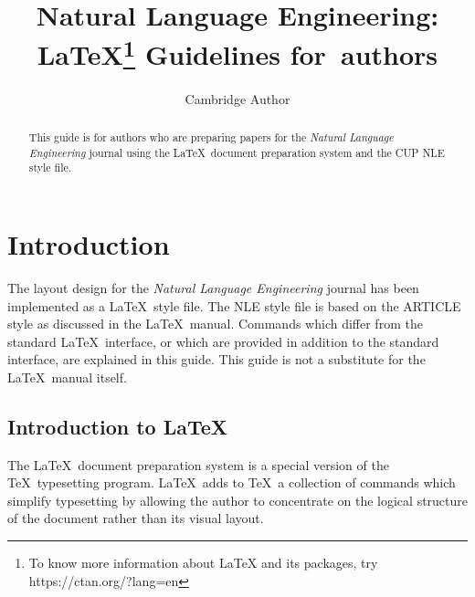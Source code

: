 \documentclass{nle}
\begin{document}
\label{firstpage}




\title{Natural Language Engineering: \LaTeX\footnote{To know more information about LaTeX and its packages, try https://ctan.org/?lang=en} Guidelines for~authors}

\begin{authgrp}
\author{Cambridge Author}
\end{authgrp}


\begin{abstract}
This guide is for authors who are preparing papers for the {\em Natural Language Engineering} journal using the \LaTeX\ document preparation
system and the CUP NLE style file.
\end{abstract}

\maketitle

\section{Introduction}

The layout design for the {\em Natural Language Engineering} journal
has been implemented as a \LaTeX\ style file. The NLE style file is based
on the ARTICLE style as discussed in the \LaTeX\ manual. Commands which
differ from the standard \LaTeX\ interface, or which are provided in addition
to the standard interface, are explained in this guide. This guide is not a
substitute for the \LaTeX\ manual itself.

\subsection{Introduction to \LaTeX}

The \LaTeX\ document preparation system is a special version of the
\TeX\ typesetting program. \LaTeX\ adds to \TeX\ a collection of
commands which simplify typesetting by allowing the author to
concentrate on the logical structure of the document rather than
its visual layout.
\end{document}

